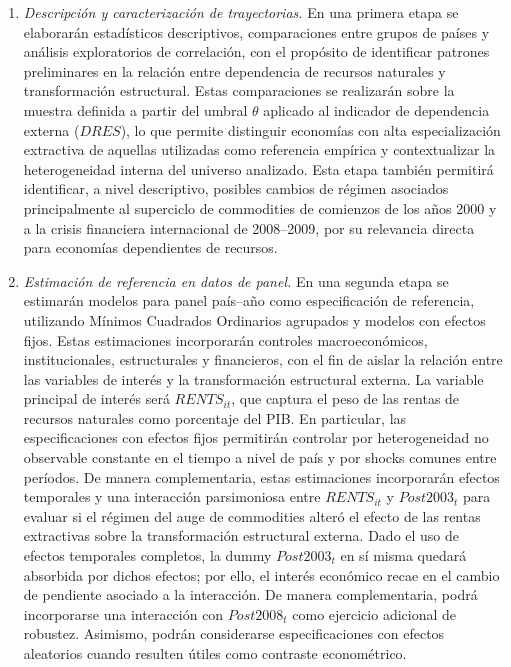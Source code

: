\documentclass[../../PTFM.tex]{subfiles}
\begin{document}
	\begin{enumerate}

		\item \emph{Descripción y caracterización de trayectorias.} En una
		primera etapa se elaborarán estadísticos descriptivos, comparaciones
		entre grupos de países y análisis exploratorios de correlación, con el
		propósito de identificar patrones preliminares en la relación entre
		dependencia de recursos naturales y transformación estructural. Estas
		comparaciones se realizarán sobre la muestra definida a partir del
		umbral $\theta$ aplicado al indicador de dependencia externa ($DRES$),
		lo que permite distinguir economías con alta especialización extractiva
		de aquellas utilizadas como referencia empírica y contextualizar la
		heterogeneidad interna del universo analizado. Esta etapa también
		permitirá identificar, a nivel descriptivo, posibles cambios de régimen
		asociados principalmente al superciclo de commodities de comienzos de
		los años 2000 y a la crisis financiera internacional de 2008--2009,
		por su relevancia directa para economías dependientes de recursos.

		\item \emph{Estimación de referencia en datos de panel.} En una segunda
		etapa se estimarán modelos para panel país--año como especificación de
		referencia, utilizando Mínimos Cuadrados Ordinarios agrupados y modelos
		con efectos fijos. Estas estimaciones incorporarán controles
		macroeconómicos, institucionales, estructurales y financieros, con el
		fin de aislar la relación entre las variables de interés y la
		transformación estructural externa. La variable principal de interés será
		$RENTS_{it}$, que captura el peso de las rentas de recursos naturales
		como porcentaje del PIB. En particular, las especificaciones con efectos
		fijos permitirán controlar por heterogeneidad no observable constante en
		el tiempo a nivel de país y por shocks comunes entre períodos. De
		manera complementaria, estas estimaciones incorporarán efectos
		temporales y una interacción parsimoniosa entre $RENTS_{it}$ y
		$Post2003_t$ para evaluar si el régimen del auge de commodities alteró
		el efecto de las rentas extractivas sobre la transformación estructural externa.
		Dado el uso de efectos temporales completos, la dummy $Post2003_t$ en sí
		misma quedará absorbida por dichos efectos; por ello, el interés
		económico recae en el cambio de pendiente asociado a la interacción. De
		manera complementaria, podrá incorporarse una interacción con
		$Post2008_t$ como ejercicio adicional de robustez. Asimismo, podrán
		considerarse especificaciones con efectos aleatorios cuando resulten
		útiles como contraste econométrico.


\end{enumerate}
\end{document}
